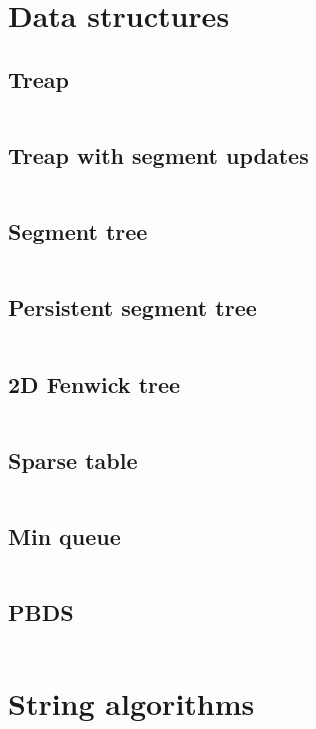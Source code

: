 ﻿\documentclass[10pt,twocolumn,oneside]{article}
\begin{document}
\pagestyle{fancy}
\fancyfoot{}
\fancyhead[R]{\thepage}

\section{Data structures}
\subsection{Treap}
\inputminted[breaklines]{cpp}{Data structures/treap.cpp}
\subsection{Treap with segment updates}
\inputminted[breaklines]{cpp}{Data structures/treap (segment updates).cpp}
\subsection{Segment tree}
\inputminted[breaklines]{cpp}{Data structures/segment tree.cpp}
\subsection{Persistent segment tree}
\inputminted[breaklines]{cpp}{Data structures/persistent segment tree.cpp}
\subsection{2D Fenwick tree}
\inputminted[breaklines]{cpp}{Data structures/fenwick 2d.cpp}
\subsection{Sparse table}
\inputminted[breaklines]{cpp}{Data structures/sparse table.cpp}
\subsection{Min queue}
\inputminted[breaklines]{cpp}{Data structures/min queue.cpp}
\subsection{PBDS}
\inputminted[breaklines]{cpp}{Data structures/pbds.cpp}

\section{String algorithms}
\end{document}
